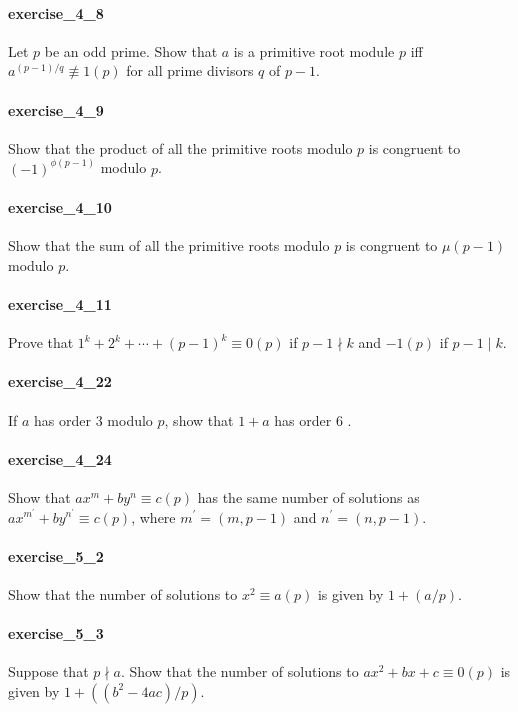 \documentclass{article}
\begin{document}
\paragraph{exercise\_4\_8} Let $p$ be an odd prime. Show that $a$ is a primitive root module $p$ iff $a^{(p-1) / q} \not \equiv 1(p)$ for all prime divisors $q$ of $p-1$.

\paragraph{exercise\_4\_9} Show that the product of all the primitive roots modulo $p$ is congruent to $(-1)^{\phi(p-1)}$ modulo $p$.

\paragraph{exercise\_4\_10} Show that the sum of all the primitive roots modulo $p$ is congruent to $\mu(p-1)$ modulo $p$.

\paragraph{exercise\_4\_11} Prove that $1^{k}+2^{k}+\cdots+(p-1)^{k} \equiv 0(p)$ if $p-1 \nmid k$ and $-1(p)$ if $p-1 \mid k$.

\paragraph{exercise\_4\_22} If $a$ has order 3 modulo $p$, show that $1+a$ has order 6 .

\paragraph{exercise\_4\_24} Show that $a x^{m}+b y^{n} \equiv c(p)$ has the same number of solutions as $a x^{m^{\prime}}+b y^{n^{\prime}} \equiv c(p)$, where $m^{\prime}=(m, p-1)$ and $n^{\prime}=(n, p-1)$.

\paragraph{exercise\_5\_2} Show that the number of solutions to $x^{2} \equiv a(p)$ is given by $1+(a / p)$.

\paragraph{exercise\_5\_3} Suppose that $p \nmid a$. Show that the number of solutions to $a x^{2}+b x+c \equiv 0(p)$ is given by $1+\left(\left(b^{2}-4 a c\right) / p\right)$.
\end{document}
